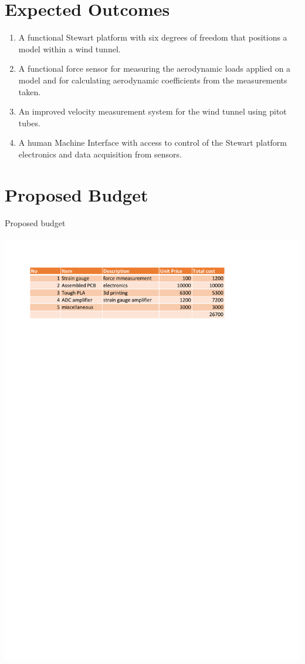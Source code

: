 \section{Expected Outcomes}
\begin{enumerate}
\item A functional Stewart platform with six degrees of freedom that positions a model within a wind tunnel.
\item A functional force sensor for measuring the aerodynamic loads applied on a model and for calculating aerodynamic coefficients from the measurements taken.
\item An improved velocity measurement system for the wind tunnel using pitot tubes.
\item A human Machine Interface with access to control  of the Stewart platform electronics and data acquisition from sensors.
\end{enumerate}
\newpage
\section{Proposed Budget}
\begin{center}
\begin{table}[!h]
\centering
\caption{Proposed budget}
\paragraph{ }
\includegraphics{Figures/budget}
\end{table}
\end{center}
